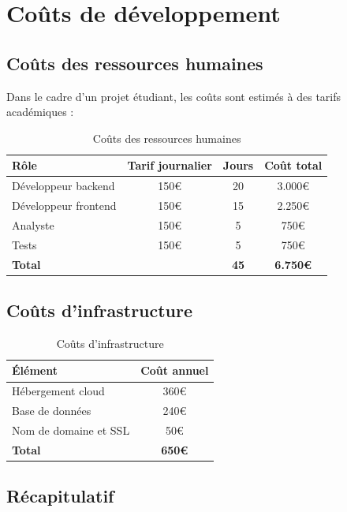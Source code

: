 \documentclass[12pt,a4paper]{report}
\begin{document}
\section{Coûts de développement}

\subsection{Coûts des ressources humaines}

Dans le cadre d'un projet étudiant, les coûts sont estimés à des tarifs académiques :

\begin{table}[h]
\centering
\begin{tabular}{|l|c|c|c|}
\hline
\textbf{Rôle} & \textbf{Tarif journalier} & \textbf{Jours} & \textbf{Coût total} \\
\hline
Développeur backend & 150€ & 20 & 3.000€ \\
Développeur frontend & 150€ & 15 & 2.250€ \\
Analyste & 150€ & 5 & 750€ \\
Tests & 150€ & 5 & 750€ \\
\hline
\textbf{Total} & & \textbf{45} & \textbf{6.750€} \\
\hline
\end{tabular}
\caption{Coûts des ressources humaines}
\end{table}

\subsection{Coûts d'infrastructure}

\begin{table}[h]
\centering
\begin{tabular}{|l|c|}
\hline
\textbf{Élément} & \textbf{Coût annuel} \\
\hline
Hébergement cloud & 360€ \\
Base de données & 240€ \\
Nom de domaine et SSL & 50€ \\
\hline
\textbf{Total} & \textbf{650€} \\
\hline
\end{tabular}
\caption{Coûts d'infrastructure}
\end{table}

\subsection{Récapitulatif}
\end{document}
